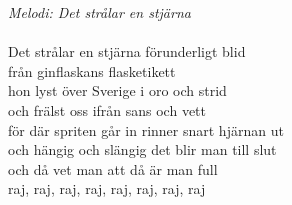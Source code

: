 {\footnotesize\textit{Melodi: Det strålar en stjärna}}\\
\\
Det strålar en stjärna förunderligt blid\\
från ginflaskans flasketikett\\
hon lyst över Sverige i oro och strid\\
och frälst oss ifrån sans och vett\\
för där spriten går in rinner snart hjärnan ut\\
och hängig och slängig det blir man till slut\\
och då vet man att då är man full\\
raj, raj, raj, raj, raj, raj, raj, raj

